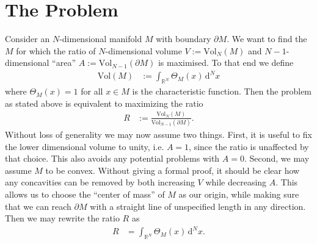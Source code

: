 \documentclass[english, parskip=full]{scrartcl}
\title{\titel}
\author{\autor}
\date{\today}
\newcommand{\intr}{}
\newcommand{\vol}{\text{Vol}}
\begin{document}
\maketitle  %

\section{The Problem}
Consider an $N$-dimensional manifold $M$ with boundary $\partial M$.
We want to find the $M$ for which the ratio of $N$-dimensional volume $V := \vol_N(M)$ and $N-1$-dimensional ``area'' $A := \vol_{N-1}(\partial M)$ is maximised.
To that end we define
\begin{align}
\vol(M) &:= \intr\int_{\mathbb{R}^{N}} \Theta_M(x) \, \mathrm{d}^{N}x
\end{align}
where $\Theta_M(x) = 1$ for all $x\in M$ is the characteristic function.
Then the problem as stated above is equivalent to maximizing the ratio
\begin{align}
R &:= \frac{\vol_N(M)}{\vol_{N-1}(\partial M)}.
\end{align}
Without loss of generality we may now assume two things.
First, it is useful to fix the lower dimensional volume to unity, i.e. $A=1$, since the ratio is unaffected by that choice.
This also avoids any potential problems with $A=0$.
Second, we may assume $M$ to be convex. 
Without giving a formal proof, it should be clear how any concavities can be removed by both increasing $V$ while decreasing $A$.
This allows us to choose the ``center of mass'' of $M$ as our origin, while making sure that we can reach $\partial M$ with a straight line of unspecified length in any direction.
Then we may rewrite the ratio $R$ as
\begin{align}
R &= \intr\int_{\mathbb{R}^{N}} \Theta_M(x) \, \mathrm{d}^{N}x.
\end{align}
\end{document}
